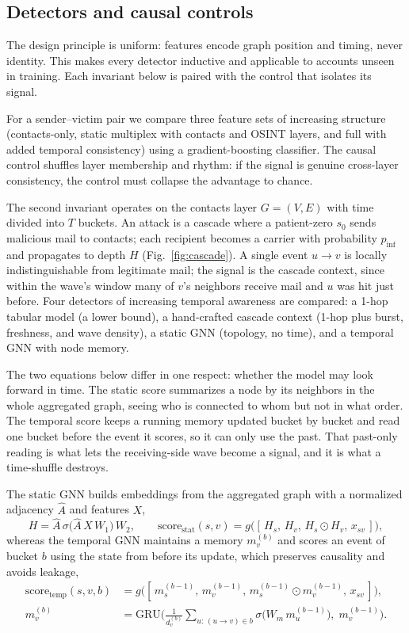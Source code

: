 \subsection{Detectors and causal controls}
\label{sec:m-detectors}
The design principle is uniform: features encode graph position and timing, never identity. This makes every detector
inductive and applicable to accounts unseen in training. Each invariant below is paired with the control that
isolates its signal.

\smallskip For a sender--victim pair we compare three feature sets of increasing structure (contacts-only, static multiplex with contacts and OSINT layers, and full with added temporal consistency) using a gradient-boosting classifier. The causal control shuffles layer membership and rhythm: if
the signal is genuine cross-layer consistency, the control must collapse the advantage to chance.

\smallskip The second invariant operates on the contacts layer
$G=(V,E)$ with time divided into $T$ buckets. An attack is a cascade where a patient-zero $s_0$ sends malicious mail
to contacts; each recipient becomes a carrier with probability $p_\mathrm{inf}$ and propagates to depth $H$
(Fig.~\ref{fig:cascade}). A single event $u\!\to\!v$ is locally indistinguishable from legitimate mail; the
signal is the cascade context, since within the wave's window many of $v$'s neighbors receive mail and $u$ was
hit just before. Four detectors of increasing temporal awareness are compared: a 1-hop tabular model (a lower
bound), a hand-crafted cascade context (1-hop plus burst, freshness, and wave density), a static GNN (topology,
no time), and a temporal GNN with node memory.

\smallskip The two equations below differ in one respect: whether the model may
look forward in time. The static score summarizes a node by its neighbors in the whole aggregated graph, seeing
who is connected to whom but not in what order. The temporal score keeps a running memory updated
bucket by bucket and read one bucket before the event it scores, so it can only use the past. That past-only
reading is what lets the receiving-side wave become a signal, and it is what a time-shuffle destroys.

\smallskip The static GNN builds embeddings from the aggregated graph with a normalized
adjacency $\hat{A}$ and features $X$,
\begin{equation}
H = \hat{A}\,\sigma\!\big(\hat{A}\,X\,W_1\big)\,W_2,
\qquad
\mathrm{score}_{\mathrm{stat}}(s,v) = g\!\big([\,H_s,\,H_v,\,H_s\!\odot\!H_v,\,x_{sv}\,]\big),
\label{eq:static}
\end{equation}
whereas the temporal GNN maintains a memory $m_v^{(b)}$ and scores an event of bucket $b$ using the state from
before its update, which preserves causality and avoids leakage,
\begin{align}
\mathrm{score}_{\mathrm{temp}}(s,v,b) &= g\!\big([\,m_s^{(b-1)},\,m_v^{(b-1)},\,m_s^{(b-1)}\!\odot\!m_v^{(b-1)},\,x_{sv}\,]\big),
\label{eq:temp-score}\\
m_v^{(b)} &= \mathrm{GRU}\!\Big(\tfrac{1}{d_v^{(b)}}\!\!\sum_{u:\,(u\to v)\in b}\!\!\sigma\!\big(W_m\,m_u^{(b-1)}\big),\; m_v^{(b-1)}\Big).
\label{eq:temp-mem}
\end{align}

